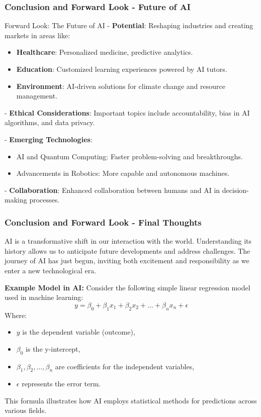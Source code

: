 \documentclass{beamer}
\begin{document}
\begin{frame}[fragile]
    \frametitle{Conclusion and Forward Look - Future of AI}
    \begin{block}{Forward Look: The Future of AI}
        - \textbf{Potential}: Reshaping industries and creating markets in areas like:
        \begin{itemize}
            \item \textbf{Healthcare}: Personalized medicine, predictive analytics.
            \item \textbf{Education}: Customized learning experiences powered by AI tutors.
            \item \textbf{Environment}: AI-driven solutions for climate change and resource management.
        \end{itemize}
        
        - \textbf{Ethical Considerations}: Important topics include accountability, bias in AI algorithms, and data privacy.
        
        - \textbf{Emerging Technologies}:
        \begin{itemize}
            \item AI and Quantum Computing: Faster problem-solving and breakthroughs.
            \item Advancements in Robotics: More capable and autonomous machines.
        \end{itemize}
        
        - \textbf{Collaboration}: Enhanced collaboration between humans and AI in decision-making processes.
    \end{block}
\end{frame}

\begin{frame}[fragile]
    \frametitle{Conclusion and Forward Look - Final Thoughts}
    AI is a transformative shift in our interaction with the world. Understanding its history allows us to anticipate future developments and address challenges. The journey of AI has just begun, inviting both excitement and responsibility as we enter a new technological era.

    \textbf{Example Model in AI:}
    Consider the following simple linear regression model used in machine learning:
    \begin{equation}
        y = \beta_0 + \beta_1 x_1 + \beta_2 x_2 + \ldots + \beta_n x_n + \epsilon
    \end{equation}
    Where:
    \begin{itemize}
        \item \(y\) is the dependent variable (outcome),
        \item \(\beta_0\) is the y-intercept,
        \item \(\beta_1, \beta_2, \ldots, \beta_n\) are coefficients for the independent variables,
        \item \(\epsilon\) represents the error term.
    \end{itemize}

    This formula illustrates how AI employs statistical methods for predictions across various fields.
\end{frame}
\end{document}
